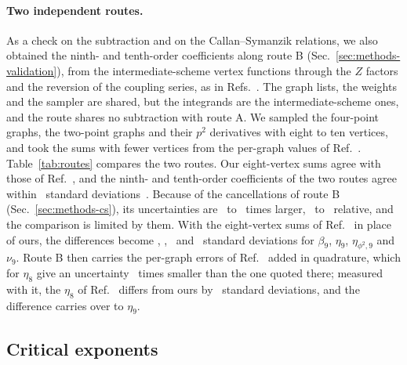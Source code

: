 \paragraph{Two independent routes.}
As a check on the subtraction and on the Callan--Symanzik relations, we also obtained the ninth- and tenth-order
coefficients along route B (Sec.~\ref{sec:methods-validation}), from the intermediate-scheme vertex functions through
the $Z$ factors and the reversion of the coupling series, as in Refs.~\cite{NMB1977,Phi4tools2024}. The graph
lists, the weights and the sampler are shared, but the integrands are the intermediate-scheme ones, and the route
shares no subtraction with route A. We sampled the four-point graphs, the two-point graphs and their $p^2$
derivatives with eight to ten vertices, and took the sums with fewer vertices from the per-graph values of
Ref.~\cite{Phi4tools2024}. Table~\ref{tab:routes} compares the two
routes. Our eight-vertex sums agree with those of Ref.~\cite{Phi4tools2024}, and the ninth- and tenth-order coefficients
of the two routes agree within \routeBzmax\ standard deviations~. Because of the cancellations of route B
(Sec.~\ref{sec:methods-cs}), its uncertainties are \routeBratiomin\ to \routeBratiomax\ times larger, \routeBrelmin\
to \routeBrelmax\ relative, and the comparison is limited by them. With the eight-vertex sums of Ref.~\cite{Phi4tools2024} in place of ours, the
differences become \routeBzphibeta, \routeBzphieta, \routeBzphietaphi\ and \routeBzphinu\ standard deviations for
$\beta_9$, $\eta_9$, $\eta_{\phi^2,9}$ and $\nu_9$. Route B then carries the per-graph errors of
Ref.~\cite{Phi4tools2024} added in quadrature, which for $\eta_8$ give an uncertainty \routeBquadratio\ times smaller
than the one quoted there; measured with it, the $\eta_8$ of Ref.~\cite{Phi4tools2024} differs from ours by
\routeBzphietaeight\ standard deviations, and the difference carries over to $\eta_9$.

\subsection{Critical exponents}
\label{sec:resummation-results}

